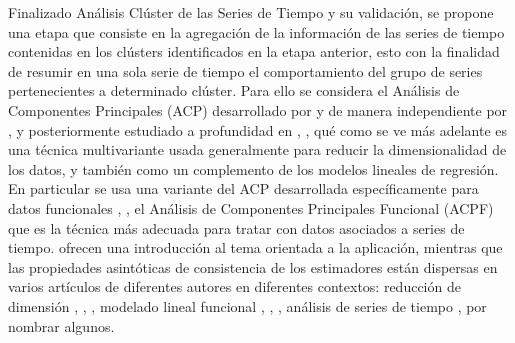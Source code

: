 \documentclass[12pt,oneside]{book}\usepackage[]{graphicx}\usepackage[]{color}
\theoremstyle{definition} %
\begin{document}
Finalizado Análisis Clúster de las Series de Tiempo y su validación, se propone una etapa que consiste en la agregación de la información de las series de tiempo contenidas en los clústers identificados en la etapa anterior, esto con la finalidad de resumir en una sola serie de tiempo el comportamiento del grupo de series pertenecientes a determinado clúster.
Para ello se considera el Análisis de Componentes Principales (ACP) desarrollado por \citeauthor{pearson1901liii} \citeyear{pearson1901liii} y de manera independiente por \citeauthor{hotelling1933analysis} \citeyear{hotelling1933analysis}, y posteriormente estudiado a profundidad en  \citeauthor{anderson2003multivariate}\citeyear{anderson2003multivariate}, \citeauthor{jolliffe2011principal}\citeyear{jolliffe2011principal}, qué como se ve más adelante es una técnica multivariante usada generalmente para reducir la dimensionalidad de los datos, y también como un complemento de los modelos lineales de regresión.
En particular se usa una variante del ACP desarrollada específicamente para datos funcionales \citeauthor{rao1958some}\citeyear{rao1958some}, \citeauthor{tucker1958determination}\citeyear{tucker1958determination}, el Análisis de Componentes Principales Funcional (ACPF) que es la técnica más adecuada para tratar con datos asociados a series de tiempo. 
  \citeauthor{ramsey1997functional}  \citeyear{ramsey1997functional} ofrecen una introducción al tema orientada a la aplicación, mientras que las propiedades asintóticas de consistencia de los estimadores están dispersas en varios artículos de diferentes autores en diferentes contextos: reducción de dimensión  \citeauthor{dauxois1982asymptotic}\citeyear{dauxois1982asymptotic}, \citeauthor{hall2006properties}\citeyear{hall2006properties}, \citeauthor{hall2009theory}\citeyear{hall2009theory}, modelado lineal funcional \citeauthor{cardot1999functional}\citeyear{cardot1999functional}, \citeauthor{cardot2003spline}\citeyear{cardot2003spline}, \citeauthor{hall2007methodology}\citeyear{hall2007methodology}, análisis de series de tiempo \citeauthor{bosq2012linear}\citeyear{bosq2012linear}, por nombrar algunos. 






\end{document}

